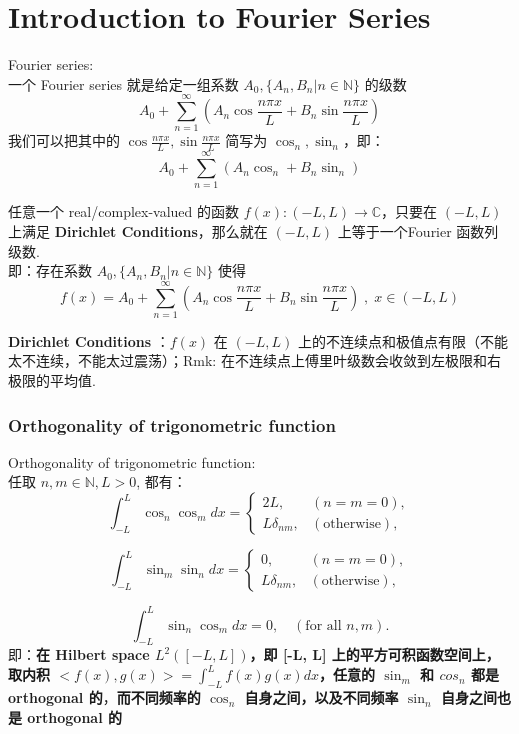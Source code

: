 \chapter{Introduction to Fourier Series}

\begin{defn}
    Fourier series:\\
    一个 Fourier series 就是给定一组系数 $A_0, \{A_n, B_n | n \in \mathbb{N}\}$ 的级数 $$
    A_0 + \sum_{n = 1} ^ \infty (A_n \cos \frac{n \pi x}{L} + B_n \sin \frac{n \pi x}{L}) 
    $$
    我们可以把其中的 $\cos \frac{n \pi x}{L}, \sin \frac{n \pi x}{L}$ 简写为 $\cos_n, \sin_n$，即：
    $$
    A_0 + \sum_{n = 1} ^ \infty (A_n \cos_n + B_n \sin _n)
    $$
\end{defn}

\begin{theorem}
    任意一个 real/complex-valued 的函数 $f(x): (-L, L) \rightarrow \mathbb{C}$，只要在 $(-L, L)$ 上满足 \textbf{Dirichlet Conditions}，那么就在 $(-L, L)$ 上等于一个Fourier 函数列级数.\\
    即：存在系数 $A_0, \{A_n, B_n | n \in \mathbb{N}\}$ 使得 
     $$
    f(x) = A_0 + \sum_{n = 1} ^ \infty (A_n \cos \frac{n \pi x}{L} + B_n \sin \frac{n \pi x}{L})\; , \; x \in (-L, L)
    $$

    \textbf{Dirichlet Conditions} ：$f(x)$ 在 $(-L,L)$ 上的不连续点和极值点有限（不能太不连续，不能太过震荡）；Rmk: 在不连续点上傅里叶级数会收敛到左极限和右极限的平均值.
 \end{theorem}



\subsection{Orthogonality of trigonometric function}
\begin{theorem}
    Orthogonality of trigonometric function:\\
    任取 $n,m \in \mathbb{N}, L > 0$, 都有：
    \[
\int_{-L}^{L} \cos_n \cos_m dx = 
\begin{cases} 
2L, & (n = m = 0), \\ 
L \delta_{nm}, & (\text{otherwise}),
\end{cases}
\]

\[
\int_{-L}^{L} \sin_m \sin_n  dx = 
\begin{cases} 
0, & (n = m = 0), \\ 
L \delta_{nm}, & (\text{otherwise}),
\end{cases}
\]

\[
\int_{-L}^{L} \sin_n \cos_m dx = 0, \quad (\text{for all } n, m).
\]
即：\textbf{在 Hilbert space $L^2([-L, L])$，即 [-L, L] 上的平方可积函数空间上，取内积 $<f(x), g(x)> = \int_{-L}^L f(x)g(x)dx$，任意的 $\sin_m$ 和 $cos_n$ 都是 orthogonal 的}，\textbf{而不同频率的 $\cos_n$ 自身之间，以及不同频率 $\sin_n$ 自身之间也是 orthogonal 的}
\end{theorem}

